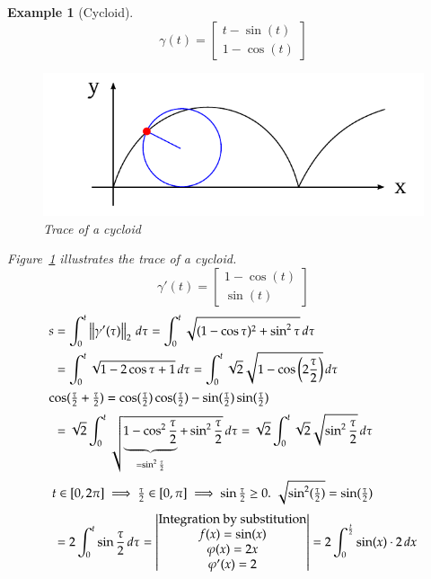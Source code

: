 \documentclass{article}
\newtheorem{example}{Example}  \numberwithin{example}{section}
\newcommand{\norm}[1]{\left\|#1\right\|}
\begin{document}
\begin{example}[Cycloid]
  \[ \gamma(t) = \begin{bmatrix} t - \sin(t) \\ 1 - \cos(t) \end{bmatrix} \]
  \begin{figure}
    \begin{center}
      \includegraphics{img/48_cycloid.pdf}
      \caption{Trace of a cycloid}
      \label{img:cycloid}
    \end{center}
  \end{figure}
  Figure~\ref{img:cycloid} illustrates the trace of a cycloid.
  \[ \gamma'(t) = \begin{bmatrix} 1 - \cos(t) \\ \sin(t) \end{bmatrix} \]
  \begin{align*}
    s &= \int_0^t \norm{\gamma'(\tau)}_2 \, d\tau = \int_0^t \sqrt{(1 - \cos\tau)^2 + \sin^2 \tau} \, d\tau \\
      &= \int_0^t \sqrt{1 - 2 \cos \tau + 1} \, d\tau = \int_0^t \sqrt2 \sqrt{1 - \cos\left(2 \frac{\tau}{2}\right)} \, d\tau \\
    \intertext{$\cos(\frac\tau2 + \frac\tau2) = \cos(\frac\tau2)\cos(\frac\tau2) - \sin(\frac\tau2)\sin(\frac\tau2)$}
      &= \sqrt{2} \int_0^t \sqrt{\underbrace{1 - \cos^2{\frac\tau2}}_{= \sin^2{\frac\tau2}} + \sin^2{\frac\tau2}} \, d\tau
      = \sqrt{2} \int_0^t \sqrt{2} \sqrt{\sin^2{\frac\tau2}} \, d\tau \\
    \intertext{
      $t \in [0, 2\pi] \implies \frac\tau2 \in [0, \pi] \implies \sin\frac\tau2 \geq 0$.
      $\sqrt{\sin^2(\frac\tau2)} = \sin(\frac\tau2)$
    }
      &= 2 \int_0^t \sin{\frac\tau2} \, d\tau = \begin{vmatrix} \text{Integration by substitution} \\ f(x) = \sin(x) \\ \varphi(x) = 2x \\ \varphi'(x) = 2 \end{vmatrix} = 2 \int_0^{\frac t2} \sin(x) \cdot 2 \, dx \\

\end{align*}
\end{example}
\end{document}
